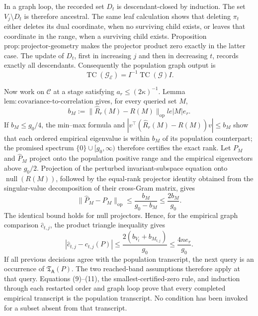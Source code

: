 In a graph loop, the recorded set \(D_t\) is descendant-closed by induction.  The set \(V_j\setminus D_t\) is therefore ancestral.  The same leaf calculation shows that deleting \(\pi_t\) either deletes its dual coordinate, when no surviving child exists, or leaves that coordinate in the range, when a surviving child exists.  Proposition \(\mathrm{prop{:}projector\mbox{-}geometry}\) makes the projector product zero exactly in the latter case.  The update of \(D_t\), first in increasing \(j\) and then in decreasing \(t\), records exactly all descendants.  Consequently the population graph output is
\[
 \operatorname{TC}(\mathcal G_{\mathcal E})
 =I^{-1}\operatorname{TC}(\mathcal G)I.
 \tag{8}
\]

Now work on \(\mathcal C\) at a stage satisfying \(a_r\le(2\kappa)^{-1}\).  Lemma \(\mathrm{lem{:}covariance\mbox{-}to\mbox{-}correlation}\) gives, for every queried set \(M\),
\[
 b_M:=\|\widehat R_r(M)-R(M)\|_{\mathrm{op}}le |M|e_r.
 \tag{9}
\]
If \(b_M\le g_0/4\), the min--max formula and \(|v^{\top}(\widehat R_r(M)-R(M))v|\le b_M\) show that each ordered empirical eigenvalue is within \(b_M\) of its population counterpart; the promised spectrum \(\{0\}\cup[g_0,\infty)\) therefore certifies the exact rank.  Let \(P_M\) and \(\widehat P_M\) project onto the population positive range and the empirical eigenvectors above \(g_0/2\).  Projection of the perturbed invariant-subspace equation onto \(\operatorname{null}(R(M))\), followed by the equal-rank projector identity obtained from the singular-value decomposition of their cross-Gram matrix, gives
\[
 \|\widehat P_M-P_M\|_{\mathrm{op}}
 \le\frac{b_M}{g_0-b_M}\le\frac{2b_M}{g_0}.
 \tag{10}
\]
The identical bound holds for null projectors.  Hence, for the empirical graph comparison \(\widehat c_{t,j}\), the product triangle inequality gives
\[
 |\widehat c_{t,j}-c_{t,j}(P)|
 \le\frac{2(b_{V_t}+b_{M_{t,j}})}{g_0}
 \le\frac{4ne_r}{g_0}.
 \tag{11}
\]
If all previous decisions agree with the population transcript, the next query is an occurrence of \(\mathfrak T_{\mathsf A}(P)\).  The two reached-band assumptions therefore apply at that query.  Equations (9)--(11), the smallest-certified-zero rule, and induction through each restarted order and graph loop prove that every completed empirical transcript is the population transcript.  No condition has been invoked for a subset absent from that transcript.

